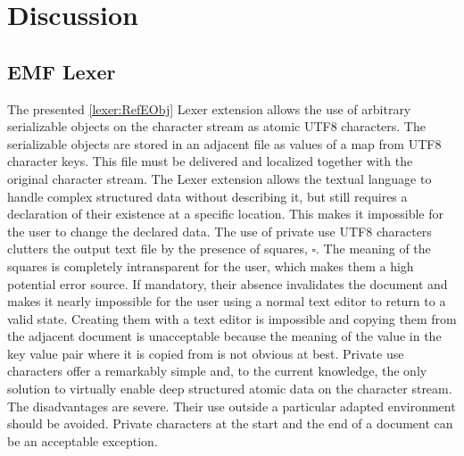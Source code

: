 \chapter{Discussion} \label{cha:discussion}
%
\section{EMF Lexer} The presented \ref{lexer:RefEObj} Lexer extension allows the use of arbitrary serializable objects on the character stream as atomic UTF8 characters. The serializable objects are stored in an adjacent file as values of a map from UTF8 character keys. This file must be delivered and localized together with the original character stream. The Lexer extension allows the textual language to handle complex structured data without describing it, but still requires a declaration of their existence at a specific location. This makes it impossible for the user to change the declared data. The use of private use UTF8 characters clutters the output text file by the presence of squares, $\square$. The meaning of the squares is completely intransparent for the user, which makes them a high potential error source. If mandatory, their absence invalidates the document and makes it nearly impossible for the user using a normal text editor to return to a valid state. Creating them with a text editor is impossible and copying them from the adjacent document is unacceptable because the meaning of the value in the key value pair where it is copied from is not obvious at best. Private use characters offer a remarkably simple and, to the current knowledge, the only solution to virtually enable deep structured atomic data on the character stream. The disadvantages are severe. Their use outside a particular adapted environment should be avoided. Private characters at the start and the end of a document can be an acceptable exception. 

